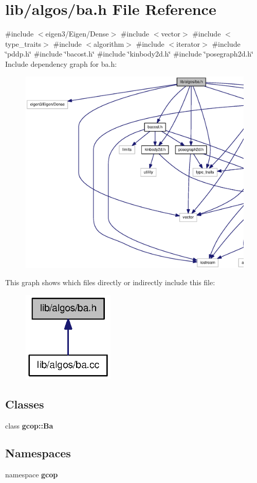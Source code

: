 \section{lib/algos/ba.h \-File \-Reference}
\label{ba_8h}
{\ttfamily \#include $<$eigen3/\-Eigen/\-Dense$>$}\*
{\ttfamily \#include $<$vector$>$}\*
{\ttfamily \#include $<$type\-\_\-traits$>$}\*
{\ttfamily \#include $<$algorithm$>$}\*
{\ttfamily \#include $<$iterator$>$}\*
{\ttfamily \#include \char`\"{}pddp.\-h\char`\"{}}\*
{\ttfamily \#include \char`\"{}bacost.\-h\char`\"{}}\*
{\ttfamily \#include \char`\"{}kinbody2d.\-h\char`\"{}}\*
{\ttfamily \#include \char`\"{}posegraph2d.\-h\char`\"{}}\*
\-Include dependency graph for ba.\-h\-:
\nopagebreak
\begin{figure}[H]
\begin{center}
\leavevmode
\includegraphics[width=350pt]{ba_8h__incl}
\end{center}
\end{figure}
\-This graph shows which files directly or indirectly include this file\-:
\nopagebreak
\begin{figure}[H]
\begin{center}
\leavevmode
\includegraphics[width=124pt]{ba_8h__dep__incl}
\end{center}
\end{figure}
\subsection*{\-Classes}
\begin{DoxyCompactItemize}
\item 
class {\bf gcop\-::\-Ba}
\end{DoxyCompactItemize}
\subsection*{\-Namespaces}
\begin{DoxyCompactItemize}
\item 
namespace {\bf gcop}
\end{DoxyCompactItemize}
